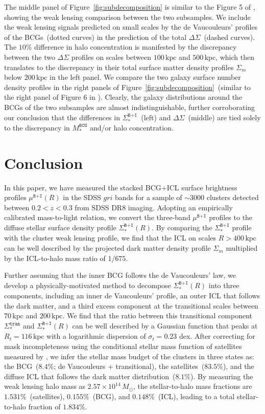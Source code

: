 \documentclass[fleqn,usenatbib]{mnras}
\newcommand{\sigbi}{\Sigma_*^{\texttt{B+I}}}
\newcommand{\sigm}{\Sigma_m}
\newcommand{\sigtr}{\Sigma_*^{\texttt{tran}}}
\newcommand{\mubi}{\mu^{\texttt{B+I}}}
\newcommand{\msbcg}{M_*^{\texttt{BCG}}}
\newcommand{\kpc}{\mathrm{kpc}}
\newcommand{\msol}{M_{\odot}}
\newcommand{\ds}{\Delta\Sigma}
\begin{document}
The middle panel of Figure~\ref{fig:subdecomposition} is similar to the
Figure 5 of , showing the weak lensing comparison
between the two subsamples. We include the weak lensing signals
predicted on small scales by the de Vaucouleurs' profiles of the
BCGs~(dotted curves) in the prediction of the total $\ds$~(dashed curves).
The $10\%$ difference in halo concentration is
manifested by the discrepancy between the two $\ds$ profiles on scales
between $100\,\kpc$ and $500\,\kpc$, which then translates to the
discrepancy in their total surface matter density profiles $\sigm$ below
$200\,\kpc$ in the left panel. We compare the two galaxy surface number
density profiles in the right panels of
Figure~\ref{fig:subdecomposition}~(similar to the right panel of Figure 6
in ). Clearly, the galaxy distributions around the BCGs
of the two subsamples are almost indistinguishable, further corroborating
our conclusion that the differences in $\sigbi$~(left) and $\ds$~(middle)
are tied solely to the discrepancy in $\msbcg$ and/or halo concentration.


\section{Conclusion}
\label{sec:conc}

In this paper, we have measured the stacked BCG+ICL surface brightness
profiles $\mubi(R)$ in the SDSS $gri$ bands for a sample of ${\sim}3000$
clusters detected between $0.2{<}z{<}0.3$ from SDSS DR8 imaging. Adopting
an empirically calibrated mass-to-light relation, we convert the three-band
$\mubi$ profiles to the diffuse stellar surface density profile
$\sigbi(R)$. By comparing the $\sigbi$ profile with the cluster weak
lensing profile, we find that the ICL on scales $R{>}400\,\kpc$ can be well
described by the projected dark matter density profile $\sigm$ multiplied
by the ICL-to-halo mass ratio of $1/675$.


Further assuming that the inner BCG follows the de Vaucouleurs' law, we
develop a physically-motivated method to decompose $\sigbi(R)$ into three
components, including an inner de Vaucouleurs' profile, an outer ICL that
follows the dark matter, and a third excess component at the transitional
scales between $70\,\kpc$ and $200\,\kpc$. We find that the ratio between
this transitional component $\sigtr$ and $\sigbi(R)$ can be well described
by a Gaussian function that peaks at $R_t{=}116\,\kpc$ with a logarithmic
dispersion of $\sigma_t{=}0.23$ dex.  After correcting for mask
incompleteness using the conditional stellar mass function of satellites
measured by \citet{Yang2012}, we infer the stellar mass
budget of the clusters in three states as: the BCG~($8.4\%$; de
Vaucouleurs + transitional), the satellites~($83.5\%$), and the diffuse ICL
that follows the dark matter distribution~($8.1\%$). By measuring the
weak lensing halo mass as $2.57{\times}10^{14}\,\msol$, the stellar-to-halo
mass fractions are $1.531\%$~(satellites), $0.155\%$~(BCG), and
$0.148\%$~(ICL), leading to a total stellar-to-halo fraction of $1.834\%$.
\end{document}

